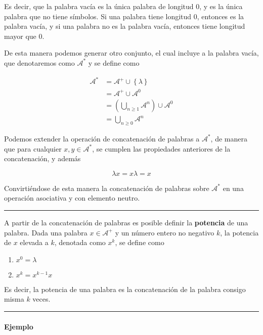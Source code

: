 Es decir, que la palabra vacía es la única palabra de longitud 0, y es
la única palabra que no tiene símbolos. Si una palabra tiene longitud 0,
entonces es la palabra vacía, y si una palabra no es la palabra vacía,
entonces tiene longitud mayor que 0.

De esta manera podemos generar otro conjunto, el cual incluye a la
palabra vacía, que denotaremos como \(\mathcal{A}^*\) y se define como


\begin{align*}
\mathcal{A}^* &= \mathcal{A}^+\cup\left\{\lambda\right\}\\
&= \mathcal{A}^+\cup\mathcal{A}^0\\
&= \left(\bigcup_{n\geq1}\mathcal{A}^n\right)\cup\mathcal{A}^0\\
&= \bigcup_{n\geq0}\mathcal{A}^n
\end{align*}


Podemos extender la operación de concatenación de palabras a
\(\mathcal{A}^*\), de manera que para cualquier \(x,y\in\mathcal{A}^*\),
se cumplen las propiedades anteriores de la concatenación, y además

\[
\lambda x = x\lambda = x
\]

Convirtiéndose de esta manera la concatenación de palabras sobre
\(\mathcal{A}^*\) en una operación asociativa y con elemento neutro.

\begin{center}\rule{0.5\linewidth}{0.5pt}\end{center}

A partir de la concatenación de palabras es posible definir la
\textbf{potencia} de una palabra. Dada una palabra \(x\in\mathcal{A}^+\)
y un número entero no negativo \(k\), la potencia de \(x\) elevada a
\(k\), denotada como \(x^k\), se define como

\begin{enumerate}
\def\labelenumi{\arabic{enumi}.}
\tightlist
\item
  \(x^0=\lambda\)
\item
  \(x^k=x^{k-1}x\)
\end{enumerate}

Es decir, la potencia de una palabra es la concatenación de la palabra
consigo misma \(k\) veces.

\begin{center}\rule{0.5\linewidth}{0.5pt}\end{center}

\paragraph{Ejemplo}\label{ejemplo-2-estructura-del-lenguaje}

